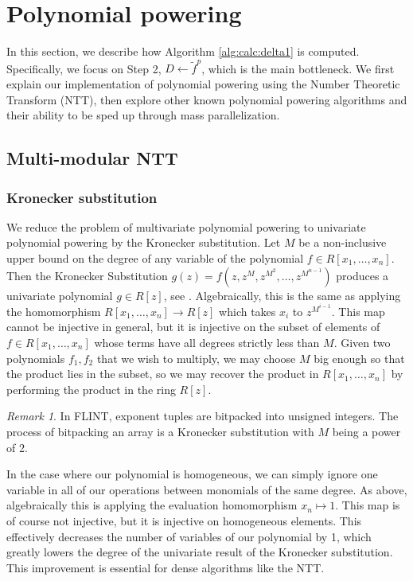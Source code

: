 \documentclass[a4paper]{article}
\theoremstyle{definition}
\theoremstyle{remark}
\newtheorem{rmk}[thm]{Remark}
\begin{document}
\section{Polynomial powering}

In this section, we describe how Algorithm \ref{alg:calc:delta1} 
is computed. Specifically, we focus on Step 2, 
\(D \gets \tilde{f}^{p}\), which is the main 
bottleneck. We first explain our implementation 
of polynomial powering using the Number Theoretic 
Transform (NTT), then explore other known polynomial 
powering algorithms and their ability to be sped up 
through mass parallelization.

\subsection{Multi-modular NTT}

\subsubsection{Kronecker substitution}
We reduce the problem of multivariate 
polynomial powering to univariate polynomial powering
by the Kronecker substitution.
Let $M$ be a non-inclusive upper bound on the degree of any variable of the polynomial
$f \in R[x_1, \dots, x_n]$. 
Then the Kronecker Substitution 
\(g(z) = f(z, z^M, z^{M^2}, \dots, z^{M^{n-1}})\)
produces a univariate polynomial $g \in R[z]$,
see \cite{arnold-2014-kronecker}.
Algebraically, this is the same as applying the 
homomorphism 
\(R[x_{1}, \ldots, x_{n}] \xrightarrow{} R[z]\)
which takes \(x_{i}\) to
\(z^{M^{i-1}}\).
This map cannot be injective in general, but it
is injective on the subset of elements of
\(f \in R[x_{1}, \ldots, x_{n}]\) 
whose terms have all degrees strictly less than \(M\).
Given two polynomials \(f_{1}, f_{2}\) that
we wish to multiply, we may choose \(M\)
big enough
so that the product lies in the subset,
so we may recover the product in 
\(R[x_{1}, \ldots, x_{n}]\) by performing
the product in the ring \(R[z]\).

\begin{rmk}
    In FLINT, exponent tuples are bitpacked into unsigned 
    integers. The process of bitpacking an array is a 
    Kronecker substitution with $M$ being a power of 2.
\end{rmk}

In the case where our polynomial is homogeneous, 
we can simply ignore one variable in all of our 
operations between monomials of the same degree. 
As above, algebraically this is applying the evaluation
homomorphism \(x_{n} \mapsto 1\).
This map is of course not injective, but it is injective on homogeneous elements.
This effectively decreases the number of variables of our polynomial by 1, 
which greatly lowers the degree of the univariate result of the
Kronecker substitution.
This improvement is essential for dense algorithms like the NTT.
\end{document}
